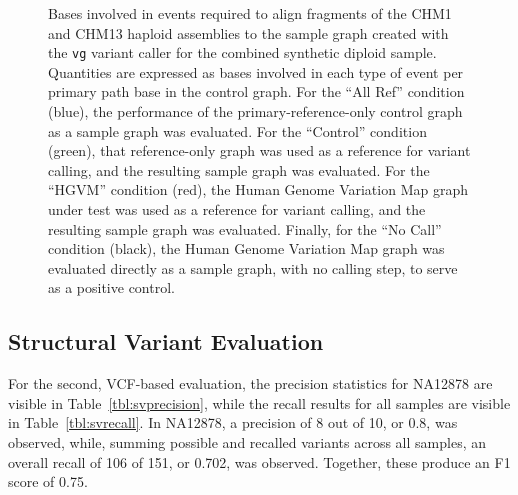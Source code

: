 \begin{figure}[p]
\caption[Mole realignment evaluation]{Bases involved in events required to align fragments of the CHM1 and CHM13 haploid assemblies to the sample graph created with the \texttt{vg} variant caller for the combined synthetic diploid sample. Quantities are expressed as bases involved in each type of event per primary path base in the control graph. For the ``All Ref'' condition (blue), the performance of the primary-reference-only control graph as a sample graph was evaluated. For the ``Control'' condition (green), that reference-only graph was used as a reference for variant calling, and the resulting sample graph was evaluated. For the ``HGVM'' condition (red), the Human Genome Variation Map graph under test was used as a reference for variant calling, and the resulting sample graph was evaluated. Finally, for the ``No Call'' condition (black), the Human Genome Variation Map graph was evaluated directly as a sample graph, with no calling step, to serve as a positive control.}
\label{fig:molerealignment}
\end{figure}

\subsection{Structural Variant Evaluation}

For the second, VCF-based evaluation, the precision statistics for NA12878 are visible in Table~\ref{tbl:svprecision}, while the recall results for all samples are visible in Table~\ref{tbl:svrecall}. %
In NA12878, a precision of 8 out of 10, or 0.8, was observed, while, summing possible and recalled variants across all samples, an overall recall of 106 of 151, or 0.702, was observed. Together, these produce an F1 score of 0.75.

